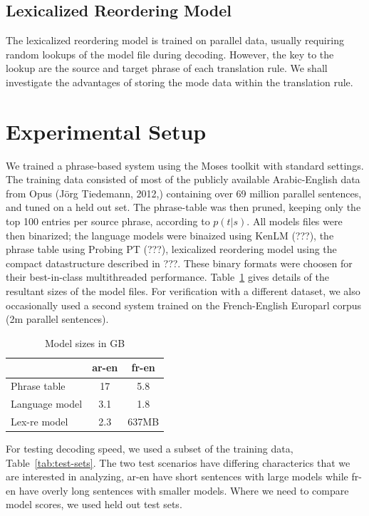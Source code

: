 \documentclass[11pt]{article}
\begin{document}
\subsection{Lexicalized Reordering Model}

The lexicalized reordering model is trained on parallel data, usually requiring random lookups of the model file during decoding. However, the key to the lookup are the source and target phrase of each translation rule. We shall investigate the advantages of storing the mode data within the translation rule.


\section{Experimental Setup}

We trained a phrase-based system using the Moses toolkit with standard settings. The training data consisted of most of the publicly available Arabic-English data from Opus (Jörg Tiedemann, 2012,) containing over 69 million parallel sentences, and tuned on a held out set. The phrase-table was then pruned, keeping only the top 100 entries per source phrase, according to $p(t|s)$. All models files were then binarized; the language models were binaized using KenLM (???), the phrase table using Probing PT (???), lexicalized reordering model using the compact datastructure described in ???. These binary formats were choosen for their best-in-class multithreaded performance. Table~\ref{tab:model-files} gives details of the resultant sizes of the model files. For verification with a different dataset, we also occasionally used a second system trained on the French-English Europarl corpus (2m parallel sentences). 
\begin{table}[h]
\begin{center}
\begin{tabular}{|l|c|c|} \hline
		& ar-en	& fr-en \\ \hline
Phrase table  	& 17 	& 5.8 \\
Language model 	& 3.1  	& 1.8 \\ 
Lex-re model	& 2.3	& 637MB \\ \hline
\end{tabular}
\end{center}
\caption{Model sizes in GB}
\label{tab:model-files}
\end{table}
For testing decoding speed, we used a subset of the training data, Table~\ref{tab:test-sets}. The two test scenarios have differing characterics that we are interested in analyzing, ar-en have short sentences with large models while fr-en have overly long sentences with smaller models. Where we need to compare model scores, we used held out test sets.
\end{document}
